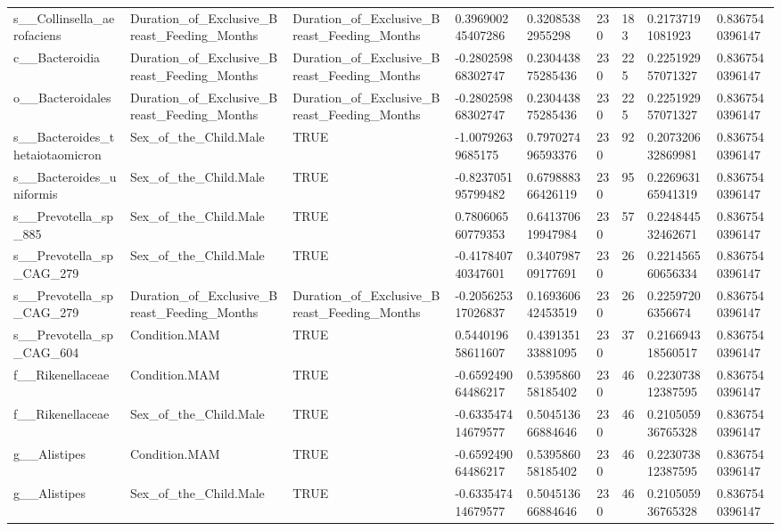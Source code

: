 \begin{longtable}{lllllllll}
s\_\_Collinsella\_aerofaciens & Duration\_of\_Exclusive\_Breast\_Feeding\_Months & Duration\_of\_Exclusive\_Breast\_Feeding\_Months & 0.396900245407286 & 0.32085382955298 & 230 & 183 & 0.21737191081923 & 0.8367540396147 \\
c\_\_Bacteroidia & Duration\_of\_Exclusive\_Breast\_Feeding\_Months & Duration\_of\_Exclusive\_Breast\_Feeding\_Months & -0.280259868302747 & 0.230443875285436 & 230 & 225 & 0.225192957071327 & 0.8367540396147 \\
o\_\_Bacteroidales & Duration\_of\_Exclusive\_Breast\_Feeding\_Months & Duration\_of\_Exclusive\_Breast\_Feeding\_Months & -0.280259868302747 & 0.230443875285436 & 230 & 225 & 0.225192957071327 & 0.8367540396147 \\
s\_\_Bacteroides\_thetaiotaomicron & Sex\_of\_the\_Child.Male & TRUE & -1.00792639685175 & 0.797027496593376 & 230 & 92 & 0.207320632869981 & 0.8367540396147 \\
s\_\_Bacteroides\_uniformis & Sex\_of\_the\_Child.Male & TRUE & -0.823705195799482 & 0.679888366426119 & 230 & 95 & 0.226963165941319 & 0.8367540396147 \\
s\_\_Prevotella\_sp\_885 & Sex\_of\_the\_Child.Male & TRUE & 0.780606560779353 & 0.641370619947984 & 230 & 57 & 0.224844532462671 & 0.8367540396147 \\
s\_\_Prevotella\_sp\_CAG\_279 & Sex\_of\_the\_Child.Male & TRUE & -0.417840740347601 & 0.340798709177691 & 230 & 26 & 0.221456560656334 & 0.8367540396147 \\
s\_\_Prevotella\_sp\_CAG\_279 & Duration\_of\_Exclusive\_Breast\_Feeding\_Months & Duration\_of\_Exclusive\_Breast\_Feeding\_Months & -0.205625317026837 & 0.169360642453519 & 230 & 26 & 0.22597206356674 & 0.8367540396147 \\
s\_\_Prevotella\_sp\_CAG\_604 & Condition.MAM & TRUE & 0.544019658611607 & 0.439135133881095 & 230 & 37 & 0.216694318560517 & 0.8367540396147 \\
f\_\_Rikenellaceae & Condition.MAM & TRUE & -0.659249064486217 & 0.539586058185402 & 230 & 46 & 0.223073812387595 & 0.8367540396147 \\
f\_\_Rikenellaceae & Sex\_of\_the\_Child.Male & TRUE & -0.633547414679577 & 0.504513666884646 & 230 & 46 & 0.210505936765328 & 0.8367540396147 \\
g\_\_Alistipes & Condition.MAM & TRUE & -0.659249064486217 & 0.539586058185402 & 230 & 46 & 0.223073812387595 & 0.8367540396147 \\
g\_\_Alistipes & Sex\_of\_the\_Child.Male & TRUE & -0.633547414679577 & 0.504513666884646 & 230 & 46 & 0.210505936765328 & 0.8367540396147 \\

\end{longtable}
